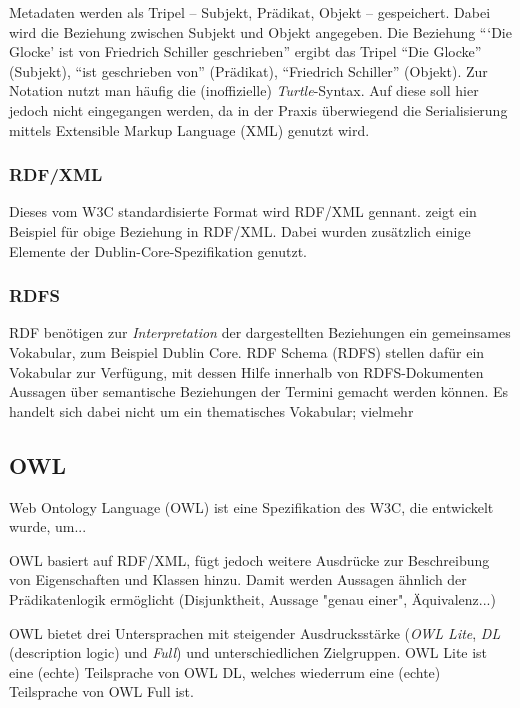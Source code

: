 	Metadaten werden als Tripel -- Subjekt, Prädikat, Objekt -- gespeichert. Dabei wird die Beziehung zwischen Subjekt und Objekt angegeben. Die Beziehung \enquote{\enquote{Die Glocke} ist von Friedrich Schiller geschrieben} ergibt das Tripel \enquote{Die Glocke} (Subjekt), \enquote{ist geschrieben von} (Prädikat), \enquote{Friedrich Schiller} (Objekt). Zur Notation nutzt man häufig die (inoffizielle) \emph{Turtle}-Syntax. %
	Auf diese soll hier jedoch nicht eingegangen werden, da in der Praxis überwiegend die Serialisierung mittels Extensible Markup Language (XML) genutzt wird.
	
	\subsubsection{RDF/XML}
	Dieses vom W3C standardisierte Format wird RDF/XML gennant.  zeigt ein Beispiel für obige Beziehung in RDF/XML. Dabei wurden zusätzlich einige Elemente der Dublin-Core-Spezifikation genutzt.

	\subsubsection{RDFS}
	RDF benötigen zur \emph{Interpretation} der dargestellten Beziehungen ein gemeinsames Vokabular, zum Beispiel Dublin Core. RDF Schema (RDFS) stellen dafür ein Vokabular zur Verfügung, mit dessen Hilfe innerhalb von RDFS-Dokumenten Aussagen über semantische Beziehungen der Termini gemacht werden können. Es handelt sich dabei nicht um ein thematisches Vokabular; vielmehr 

	\subsection{OWL}
	Web Ontology Language (OWL) ist eine Spezifikation des W3C, die entwickelt wurde, um...
	
	OWL basiert auf RDF/XML, fügt jedoch weitere Ausdrücke zur Beschreibung von Eigenschaften und Klassen hinzu. Damit werden Aussagen ähnlich der Prädikatenlogik ermöglicht (Disjunktheit, Aussage "genau einer", Äquivalenz...)
	
	OWL bietet drei Untersprachen mit steigender Ausdrucksstärke (\emph{OWL Lite}, \emph{DL} (description logic) und \emph{Full}) und unterschiedlichen Zielgruppen. OWL Lite ist eine (echte) Teilsprache von OWL DL, welches wiederrum eine (echte) Teilsprache von OWL Full ist.
	
